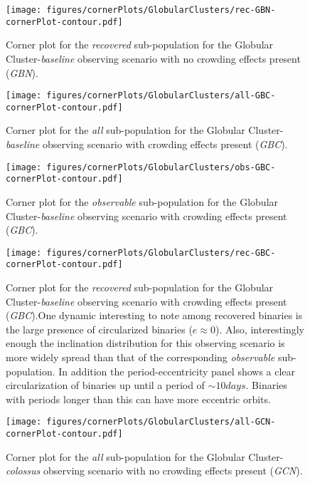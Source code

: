 \documentclass[twocolumn]{aastex63}
\begin{document}
\begin{figure}
    \centering
    \texttt{[image: figures/cornerPlots/GlobularClusters/rec-GBN-cornerPlot-contour.pdf]}
    \caption{Corner plot for the \textit{recovered} sub-population for the Globular Cluster-\textit{baseline} observing scenario with no crowding effects present (\textit{GBN}). }
    \label{fig:gbn-corner-plot-appendix}
\end{figure}\clearpage

\begin{figure}
    \centering
    \texttt{[image: figures/cornerPlots/GlobularClusters/all-GBC-cornerPlot-contour.pdf]}
    \caption{Corner plot for the \textit{all} sub-population for the Globular Cluster-\textit{baseline} observing scenario with crowding effects present (\textit{GBC}).}
    \label{fig:gbc-corner-plot-appendix}
\end{figure}\clearpage

\begin{figure}
    \centering
    \texttt{[image: figures/cornerPlots/GlobularClusters/obs-GBC-cornerPlot-contour.pdf]}
    \caption{Corner plot for the \textit{observable} sub-population for the Globular Cluster-\textit{baseline} observing scenario with crowding effects present (\textit{GBC}).}
    \label{fig:gbc-obs-corner-plot-appendix}
\end{figure}\clearpage

\begin{figure}
    \centering
    \texttt{[image: figures/cornerPlots/GlobularClusters/rec-GBC-cornerPlot-contour.pdf]}
    \caption{Corner plot for the \textit{recovered} sub-population for the Globular Cluster-\textit{baseline} observing scenario with crowding effects present (\textit{GBC}).One dynamic interesting to note among recovered binaries is the large presence of circularized binaries ($e \approx 0$). Also, interestingly enough the inclination distribution for this observing scenario is more widely spread than that of the corresponding \textit{observable} sub-population. In addition the period-eccentricity panel shows a clear circularization of binaries up until a period of $\sim10 days$. Binaries with periods longer than this can have more eccentric orbits.}
    \label{fig:gbc-rec-corner-plot-appendix}
\end{figure}\clearpage
\begin{figure}
    \centering
    \texttt{[image: figures/cornerPlots/GlobularClusters/all-GCN-cornerPlot-contour.pdf]}
    \caption{Corner plot for the \textit{all} sub-population for the Globular Cluster-\textit{colossus} observing scenario with no crowding effects present (\textit{GCN}).}
    \label{fig:gcn-All-corner-plot-appendix}
\end{figure}\clearpage
\end{document}
